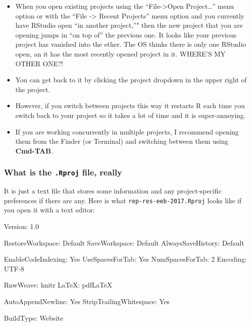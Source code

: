 \documentclass[]{book}
\newenvironment{Shaded}{\begin{snugshade}}{\end{snugshade}}
\newcommand{\FunctionTok}[1]{\textcolor[rgb]{0.00,0.00,0.00}{{#1}}}
\newcommand{\NormalTok}[1]{{#1}}
\providecommand{\tightlist}{%
  \setlength{\itemsep}{0pt}\setlength{\parskip}{0pt}}
\theoremstyle{definition}
\theoremstyle{definition}
\theoremstyle{remark}
\begin{document}
\begin{itemize}
\tightlist
\item
  When you open existing projects using the ``File-\textgreater{}Open
  Project\ldots{}'' menu option or with the ``File -\textgreater{}
  Recent Projects'' menu option and you currently have RStudio open ``in
  another project,''" then the new project that you are opening jumps in
  ``on top of'' the previous one. It looks like your previous project
  has vanished into the ether. The OS thinks there is only one RStudio
  open, an it has the most recently opened project in it. WHERE'S MY
  OTHER ONE?!
\item
  You can get back to it by clicking the project dropdown in the upper
  right of the project.
\item
  However, if you switch between projects this way it restarts R each
  time you switch back to your project so it takes a lot of time and it
  is super-annoying.
\item
  If you are working concurrently in multiple projects, I recommend
  opening them from the Finder (or Terminal) and switching between them
  using \textbf{Cmd-TAB}.
\end{itemize}

\subsubsection{\texorpdfstring{What is the \texttt{.Rproj} file,
really}{What is the .Rproj file, really}}\label{what-is-the-.rproj-file-really}

It is just a text file that stores some information and any
project-specific preferences if there are any. Here is what
\texttt{rep-res-eeb-2017.Rproj} looks like if you open it with a text
editor:

\begin{Shaded}
\begin{Highlighting}[]
\FunctionTok{Version:} \NormalTok{1.0}

\FunctionTok{RestoreWorkspace:} \NormalTok{Default}
\FunctionTok{SaveWorkspace:} \NormalTok{Default}
\FunctionTok{AlwaysSaveHistory:} \NormalTok{Default}

\FunctionTok{EnableCodeIndexing:} \NormalTok{Yes}
\FunctionTok{UseSpacesForTab:} \NormalTok{Yes}
\FunctionTok{NumSpacesForTab:} \NormalTok{2}
\FunctionTok{Encoding:} \NormalTok{UTF-8}

\FunctionTok{RnwWeave:} \NormalTok{knitr}
\FunctionTok{LaTeX:} \NormalTok{pdfLaTeX}

\FunctionTok{AutoAppendNewline:} \NormalTok{Yes}
\FunctionTok{StripTrailingWhitespace:} \NormalTok{Yes}

\FunctionTok{BuildType:} \NormalTok{Website}
\end{Highlighting}
\end{Shaded}
\end{document}
